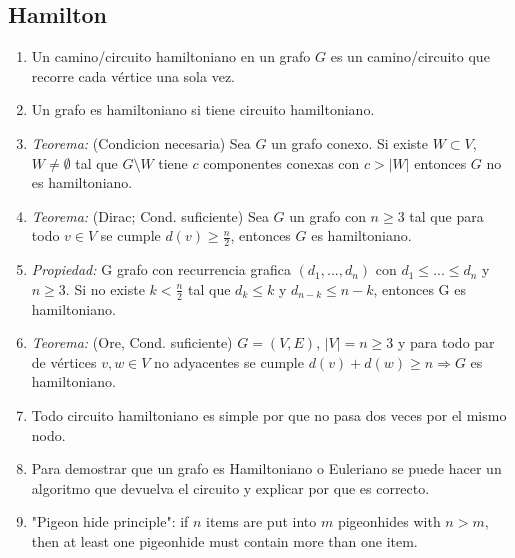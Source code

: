 \subsection{Hamilton}
\begin{enumerate}
\item Un camino/circuito hamiltoniano en un grafo $G$ es un camino/circuito que recorre cada vértice una sola vez.
\item Un grafo es hamiltoniano si tiene circuito hamiltoniano.
\item \textit{Teorema:} (Condicion necesaria) Sea $G$ un grafo conexo. Si existe $ W \subset V$, $W \neq \emptyset$ tal que $G \setminus W$ tiene $c$ componentes conexas con $c > |W|$ entonces $G$ no es hamiltoniano.
\item \textit{Teorema:} (Dirac; Cond. suficiente) Sea $G$ un grafo con $n \geq 3$ tal que para todo $v \in V$ se cumple $d(v) \geq \frac{n}{2}$, entonces $G$ es hamiltoniano.
\item \textit{Propiedad:} G grafo con recurrencia grafica $(d_{1},...,d_{n})$ con $d_{1} \leq ... \leq d_{n}$ y $n \geq 3$. Si no existe $k < \frac{n}{2}$ tal que $d_{k} \leq k$ y $d_{n-k} \leq n-k$, entonces G es hamiltoniano.
\item \textit{Teorema:} (Ore, Cond. suficiente) $G=(V,E)$, $|V| = n \geq 3$ y para todo par de vértices $v,w \in V$ no adyacentes se cumple $d(v)+d(w)\geq n \Rightarrow G$ es hamiltoniano.
\item Todo circuito hamiltoniano es simple por que no pasa dos veces por el mismo nodo.
\item Para demostrar que un grafo es Hamiltoniano o Euleriano se puede hacer un algoritmo que devuelva el circuito y explicar por que es correcto.
\item "Pigeon hide principle": if $n$ items are put into $m$ pigeonhides with $n>m$, then at least one pigeonhide must contain more than one item.
\end{enumerate}
